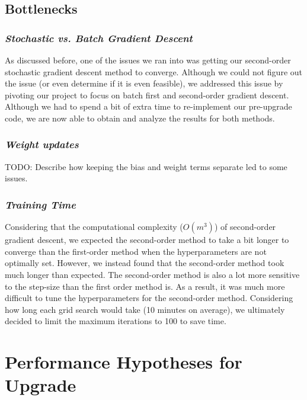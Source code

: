 \documentclass[11pt]{extarticle}
\begin{document}
\subsection{Bottlenecks}

\subsubsection{\textit{Stochastic vs. Batch Gradient Descent}}

As discussed before, one of the issues we ran into was getting our second-order stochastic gradient descent method to converge. Although we could not figure out the issue (or even determine if it is even feasible), we addressed this issue by pivoting our project to focus on batch first and second-order gradient descent. Although we had to spend a bit of extra time to re-implement our pre-upgrade code, we are now able to obtain and analyze the results for both methods.

\subsubsection{\textit{Weight updates}}

TODO: Describe how keeping the bias and weight terms separate led to some issues.

\subsubsection{\textit{Training Time}}

Considering that the computational complexity ($O(m^3)$) of second-order gradient descent, we expected the second-order method to take a bit longer to converge than the first-order method when the hyperparameters are not optimally set. However, we instead found that the second-order method took much longer than expected. The second-order method is also a lot more sensitive to the step-size than the first order method is. As a result, it was much more difficult to tune the hyperparameters for the second-order method. Considering how long each grid search would take (10 minutes on average), we ultimately decided to limit the maximum iterations to 100 to save time.

\newpage

\section{Performance Hypotheses for Upgrade}
\end{document}
